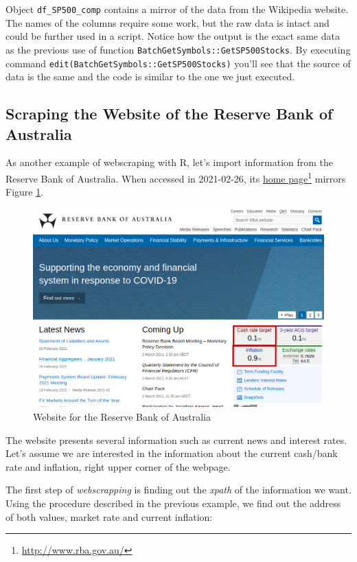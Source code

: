\documentclass[
  12pt,
]{book}
\begin{document}
Object \texttt{df\_SP500\_comp} contains a mirror of the data from the Wikipedia website. The names of the columns require some work, but the raw data is intact and could be further used in a script. Notice how the output is the exact same data as the previous use of function \texttt{BatchGetSymbols::GetSP500Stocks}. By executing command \texttt{edit(BatchGetSymbols::GetSP500Stocks)} you'll see that the source of data is the same and the code is similar to the one we just executed.

\hypertarget{scraping-the-website-of-the-reserve-bank-of-australia}{%
\subsection{Scraping the Website of the Reserve Bank of Australia}\label{scraping-the-website-of-the-reserve-bank-of-australia}}

As another example of webscraping with R, let's import information from the Reserve Bank of Australia. When accessed in 2021-02-26, its \href{http://www.rba.gov.au/}{home page}\footnote{\url{http://www.rba.gov.au/}} mirrors Figure \ref{fig:RBA-website}.

\begin{figure}[!htbp]

{\centering \includegraphics[width=0.75\linewidth]{figs/website_RBA-webscrapping} 

}

\caption{Website for the Reserve Bank of Australia}\label{fig:RBA-website}
\end{figure}

The website presents several information such as current news and interest rates. Let's assume we are interested in the information about the current cash/bank rate and inflation, right upper corner of the webpage.

The first step of \emph{webscrapping} is finding out the \emph{xpath} of the information we want. Using the procedure described in the previous example, we find out the address of both values, market rate and current inflation:
\end{document}

